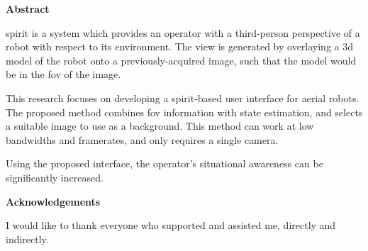 \newcommand\summaryname{Abstract}
\newenvironment{summary} {
  \cleardoublepage
  \thispagestyle{empty}
  \null\vfill
  \begin{center}
    \bfseries \summaryname
  \end{center}
}
\vfill\null
\begin{summary}
  \gls{spirit} is a system which provides an operator with a third-person perspective of a robot with respect to its environment.
  The view is generated by overlaying a \gls{3d} model of the robot onto a previously-acquired image, such that the model would be in the \gls{fov} of the image.

  This research focuses on developing a \gls{spirit}-based user interface for aerial robots.
  The proposed method combines \gls{fov} information with state estimation, and selects a suitable image to use as a background.
  This method can work at low bandwidths and framerates, and only requires a single camera.

  Using the proposed interface, the operator's situational awareness can be significantly increased.
\end{summary}

\newcommand\ackname{Acknowledgements}
\newenvironment{acknowledgements} {
  \clearpage
  \thispagestyle{empty}
  \null\vfill
  \begin{center}%
    \bfseries \ackname
  \end{center}
}
\vfill\null
\begin{acknowledgements}
  I would like to thank everyone who supported and assisted me, directly and indirectly.
\end{acknowledgements}

\tableofcontents
\listoffigures

\glsresetall
